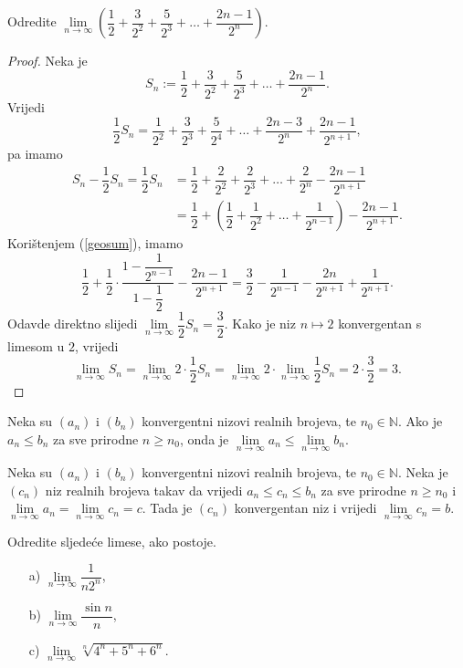\begin{exercise}
Odredite $\lim\limits_{n\to \infty}\left(\dfrac{1}{2}+\dfrac{3}{2^2}+\dfrac{5}{2^3}+\dots+\dfrac{2n-1}{2^n}\right)$.
\end{exercise}
\begin{proof}
Neka je
$$S_n:=\dfrac{1}{2}+\dfrac{3}{2^2}+\dfrac{5}{2^3}+\dots+\dfrac{2n-1}{2^n}.$$
Vrijedi
$$\dfrac{1}{2}S_n=\dfrac{1}{2^2}+\dfrac{3}{2^3}+\dfrac{5}{2^4}+\dots+\dfrac{2n-3}{2^{n}}+\dfrac{2n-1}{2^{n+1}},$$
pa imamo
\begin{align*}
S_n-\dfrac{1}{2}S_n=\dfrac{1}{2}S_n&=\dfrac{1}{2}+\dfrac{2}{2^2}+\dfrac{2}{2^3}+\dots+\dfrac{2}{2^n}-\dfrac{2n-1}{2^{n+1}}\\
&=\dfrac{1}{2}+\left(\dfrac{1}{2}+\dfrac{1}{2^2}+\dots+\dfrac{1}{2^{n-1}}\right)-\dfrac{2n-1}{2^{n+1}}.
\end{align*}
Korištenjem (\ref{geosum}), imamo
$$\dfrac{1}{2}+\dfrac{1}{2}\cdot\dfrac{1-\dfrac{1}{2^{n-1}}}{1-\dfrac{1}{2}}-\dfrac{2n-1}{2^{n+1}}=\dfrac{3}{2}-\dfrac{1}{2^{n-1}}-\dfrac{2n}{2^{n+1}}+\dfrac{1}{2^{n+1}}.$$
Odavde direktno slijedi $\lim\limits_{n\to \infty}{\dfrac{1}{2}S_n}=\dfrac{3}{2}$. Kako je niz $n\mapsto 2$ konvergentan s limesom u $2$, vrijedi
$$\lim\limits_{n\to \infty}{S_n}=\lim\limits_{n\to \infty}{2\cdot \dfrac{1}{2}S_n}=\lim\limits_{n\to \infty}{2}\cdot \lim\limits_{n\to \infty}{\dfrac{1}{2}S_n}=2\cdot \dfrac{3}{2}=3.$$
\end{proof}
\begin{remark}
\label{limitpreservesordering}
Neka su $(a_n)$ i $(b_n)$ konvergentni nizovi realnih brojeva, te $n_0\in \mathbb{N}$. Ako je $a_n\leq b_n$ za sve prirodne $n\geq n_0$, onda je $\lim\limits_{n\to \infty}{a_n}\leq \lim\limits_{n\to \infty}{b_n}$.
\end{remark}
\begin{remark} 
Neka su $(a_n)$ i $(b_n)$ konvergentni nizovi realnih brojeva, te $n_0\in \mathbb{N}$. Neka je $(c_n)$ niz realnih brojeva takav da vrijedi $a_n\leq c_n\leq b_n$ za sve prirodne $n\geq n_0$ i $\lim\limits_{n\to \infty}{a_n}=\lim\limits_{n\to \infty}{c_n}=c$. Tada je $(c_n)$ konvergentan niz i vrijedi $\lim\limits_{n\to \infty}{c_n}=b$.
\end{remark}
\begin{exercise} Odredite sljedeće limese, ako postoje.
\begin{itemize}
\item[a)] $\lim\limits_{n\to \infty}{\dfrac{1}{n2^n}}$,
\item[b)] $\lim\limits_{n\to \infty}{\dfrac{\sin{n}}{n}}$,
\item[c)] $\lim\limits_{n\to \infty}{\sqrt[n]{4^n+5^n+6^n}}$.
\end{itemize}
\end{exercise}
